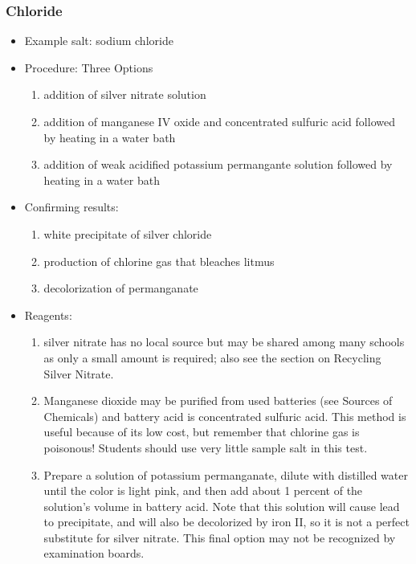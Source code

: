 \subsubsection{Chloride}
\begin{itemize}
\item{Example salt: sodium chloride}
\item{Procedure: Three Options
\begin{enumerate}
\item{addition of silver nitrate solution}
\item{addition of manganese IV oxide and concentrated sulfuric acid 
followed by heating in a water bath}
\item{addition of weak acidified potassium permangante solution 
followed by heating in a water bath}
\end{enumerate}
} %
\item{Confirming results:
\begin{enumerate}
\item{white precipitate of silver chloride} 
\item{production of chlorine gas that bleaches litmus} 
\item{decolorization of permanganate}
\end{enumerate}
} %
\item{Reagents:
\begin{enumerate}
\item{silver nitrate has no local source 
but may be shared among many schools as only a small amount is required; 
also see the section on Recycling Silver Nitrate.}
\item{Manganese dioxide may be purified from used batteries 
(see Sources of Chemicals) and battery acid is concentrated sulfuric acid. 
This method is useful because of its low cost, 
but remember that chlorine gas is poisonous! 
Students should use very little sample salt in this test.}
\item{Prepare a solution of potassium permanganate, 
dilute with distilled water until the color is light pink, 
and then add about 1 percent of the solution's volume in battery acid. 
Note that this solution will cause lead to precipitate, 
and will also be decolorized by iron II, 
so it is not a perfect substitute for silver nitrate. 
This final option may not be recognized by examination boards.}
\end{enumerate}
} %
\end{itemize}

